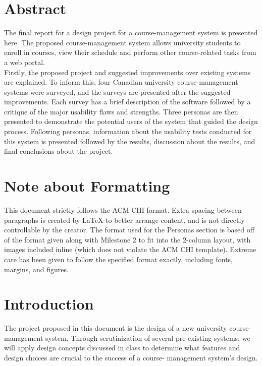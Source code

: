 \documentclass[10pt]{article}
\begin{document}
\begin{multicols}{2}

\section*{Abstract}
The final report for a design project for a course-management system is presented 
here. The proposed course-management system allows university students to enroll in courses, view their 
schedule and perform other course-related tasks from a web portal.\\

Firstly, the proposed project and suggested improvements over existing systems are explained. To inform this, four Canadian university course-management systems were surveyed, and the surveys are presented after the suggested improvements. Each survey 
has a brief description of the software followed by a critique of the major usability flaws and 
strengths. Three personas are then presented to demonstrate the potential users of the system that guided the design process. Following personas, information about the usability 
tests conducted for this system is presented followed by the results, discussion about the results, and final conclusions about the project.

\section*{Note about Formatting}
This document strictly follows the ACM CHI format. Extra spacing between paragraphs is created by LaTeX to better arrange content, and is not directly controllable by the creator. The format used for the Personas section is based off of the format given along with Milestone 2 to fit into the 2-column layout, with images included inline (which does not violate the ACM CHI template). Extreme care has been given to follow the specified format exactly, including fonts, margins, and figures.

\section*{Introduction}

The project proposed in this document is the design of a new 
university course-management system. Through scrutinization of several 
pre-existing systems, we will apply design concepts discussed in class to 
determine what features and design choices are crucial to the success of a course-
management system's design.\\


\end{multicols}
\end{document}
